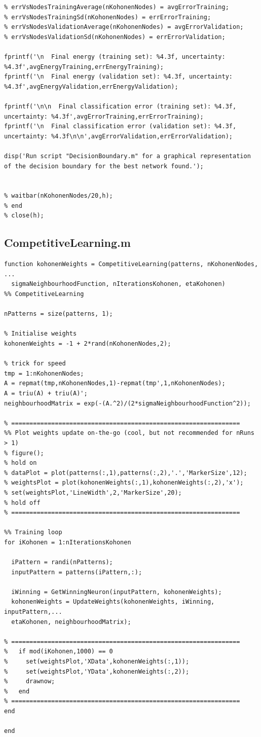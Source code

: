 \documentclass[12pt,titlepage]{article}
\begin{document}
\begin{lstlisting}
% errVsNodesTrainingAverage(nKohonenNodes) = avgErrorTraining;
% errVsNodesTrainingSd(nKohonenNodes) = errErrorTraining;
% errVsNodesValidationAverage(nKohonenNodes) = avgErrorValidation;
% errVsNodesValidationSd(nKohonenNodes) = errErrorValidation;

fprintf('\n  Final energy (training set): %4.3f, uncertainty: %4.3f',avgEnergyTraining,errEnergyTraining);
fprintf('\n  Final energy (validation set): %4.3f, uncertainty: %4.3f',avgEnergyValidation,errEnergyValidation);

fprintf('\n\n  Final classification error (training set): %4.3f, uncertainty: %4.3f',avgErrorTraining,errErrorTraining);
fprintf('\n  Final classification error (validation set): %4.3f, uncertainty: %4.3f\n\n',avgErrorValidation,errErrorValidation);

disp('Run script "DecisionBoundary.m" for a graphical representation of the decision boundary for the best network found.');


% waitbar(nKohonenNodes/20,h);
% end
% close(h);
\end{lstlisting}

\subsection*{CompetitiveLearning.m}
\begin{lstlisting}
function kohonenWeights = CompetitiveLearning(patterns, nKohonenNodes, ...
  sigmaNeighbourhoodFunction, nIterationsKohonen, etaKohonen)
%% CompetitiveLearning

nPatterns = size(patterns, 1);

% Initialise weights
kohonenWeights = -1 + 2*rand(nKohonenNodes,2);

% trick for speed
tmp = 1:nKohonenNodes;
A = repmat(tmp,nKohonenNodes,1)-repmat(tmp',1,nKohonenNodes);
A = triu(A) + triu(A)';
neighbourhoodMatrix = exp(-(A.^2)/(2*sigmaNeighbourhoodFunction^2));

% ===============================================================
%% Plot weights update on-the-go (cool, but not recommended for nRuns > 1)
% figure();
% hold on
% dataPlot = plot(patterns(:,1),patterns(:,2),'.','MarkerSize',12);
% weightsPlot = plot(kohonenWeights(:,1),kohonenWeights(:,2),'x');
% set(weightsPlot,'LineWidth',2,'MarkerSize',20);   
% hold off
% ===============================================================

%% Training loop
for iKohonen = 1:nIterationsKohonen
    
  iPattern = randi(nPatterns); 
  inputPattern = patterns(iPattern,:);
  
  iWinning = GetWinningNeuron(inputPattern, kohonenWeights);
  kohonenWeights = UpdateWeights(kohonenWeights, iWinning, inputPattern,...
  etaKohonen, neighbourhoodMatrix);

% ===============================================================    
%   if mod(iKohonen,1000) == 0
%     set(weightsPlot,'XData',kohonenWeights(:,1));
%     set(weightsPlot,'YData',kohonenWeights(:,2));
%     drawnow;
%   end
% ===============================================================
end

end
\end{lstlisting}
\end{document}
